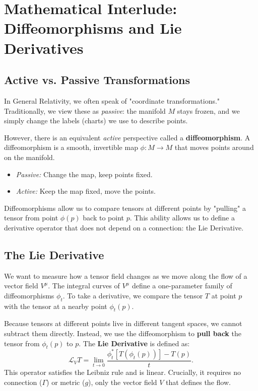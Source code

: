 \documentclass[11pt, a4paper]{report}
\begin{document}
\section{Mathematical Interlude: Diffeomorphisms and Lie Derivatives}

\subsection*{Active vs. Passive Transformations}
In General Relativity, we often speak of "coordinate transformations." Traditionally, we view these as \textit{passive}: the manifold $M$ stays frozen, and we simply change the labels (charts) we use to describe points.

However, there is an equivalent \textit{active} perspective called a \textbf{diffeomorphism}. A diffeomorphism is a smooth, invertible map $\phi: M \to M$ that moves points around on the manifold.
\begin{itemize}
    \item \textit{Passive:} Change the map, keep points fixed.
    \item \textit{Active:} Keep the map fixed, move the points.
\end{itemize}
Diffeomorphisms allow us to compare tensors at different points by "pulling" a tensor from point $\phi(p)$ back to point $p$. This ability allows us to define a derivative operator that does not depend on a connection: the Lie Derivative.


\subsection*{The Lie Derivative}
We want to measure how a tensor field changes as we move along the flow of a vector field $V^\mu$. The integral curves of $V^\mu$ define a one-parameter family of diffeomorphisms $\phi_t$. To take a derivative, we compare the tensor $T$ at point $p$ with the tensor at a nearby point $\phi_t(p)$.

Because tensors at different points live in different tangent spaces, we cannot subtract them directly. Instead, we use the diffeomorphism to \textbf{pull back} the tensor from $\phi_t(p)$ to $p$. The \textbf{Lie Derivative} is defined as:
\begin{equation}
\mathcal{L}_V T = \lim_{t \to 0} \frac{\phi_t^* [T(\phi_t(p))] - T(p)}{t}.
\end{equation}
This operator satisfies the Leibniz rule and is linear. Crucially, it requires no connection ($\Gamma$) or metric ($g$), only the vector field $V$ that defines the flow.
\end{document}
